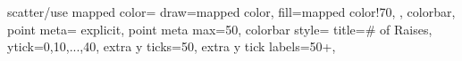 scatter/use mapped color={
            draw=mapped color,
            fill=mapped color!70,
        }, colorbar, point meta= explicit, point meta max=50,
    colorbar style={
        title={\# of Raises},
        ytick={0,10,...,40}, extra y ticks={50},
        extra y tick labels={50+}},
